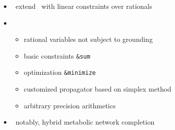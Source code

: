 \begin{frame}{\clingolpx}
  \begin{itemize}
  \item {} \ extend \clingo\ with linear constraints over rationals
  \item {} \
    \begin{itemize}
    \item rational variables not subject to grounding
    \item basic constraints \lstinline{&sum}
    \item optimization  \lstinline{&minimize}
    \item customized propagator based on simplex method
    \item arbitrary precision arithmetics
    \end{itemize}
  \item {} \ notably, hybrid metabolic network completion~\cite{frscscsiwa18a}
  \end{itemize}
\end{frame}
%
